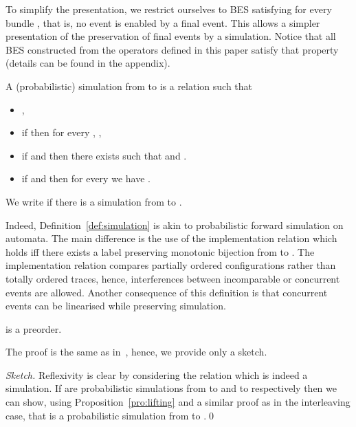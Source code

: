 \documentclass{llncs}
\newcommand{\<}{\langle}
\renewcommand{\>}{\rangle}
\begin{document}
To simplify the presentation, we restrict ourselves to BES satisfying  for every bundle , that is, no event is enabled by a final event. This allows a simpler presentation of the preservation of final events by a simulation. Notice that all BES constructed from the operators defined in this paper satisfy that property (details can be found in the appendix).

\begin{definition}\label{def:simulation}
A (probabilistic) simulation from  to  is a relation  such that
\begin{itemize}
\item ,
\item if  then for every , ,
\item if  and  then there exists  such that  and .
\item if  and  then for every  we have .
\end{itemize}
We write  if there is a simulation from  to .
\end{definition}
Indeed, Definition~\ref{def:simulation} is akin to probabilistic forward simulation on automata. The main difference is the use of the implementation relation  which holds iff there exists a label preserving monotonic bijection from  to . The implementation relation compares partially ordered configurations rather than totally ordered traces, hence, interferences between incomparable or concurrent events are allowed. Another consequence of this definition is that concurrent events can be linearised while preserving simulation.

\begin{proposition}\label{pro:preorder}
 is a preorder.
\end{proposition}

The proof is the same as in~\cite{Den07a}, hence, we provide only a sketch.

\begin{proof}[Sketch]
Reflexivity is clear by considering the relation  which is indeed a simulation. If  are probabilistic simulations from  to  and  to  respectively then we can show, using Proposition~\ref{pro:lifting} and a similar proof as in the interleaving case, that  is a probabilistic simulation from  to .\qed 
\end{proof}
\end{document}
